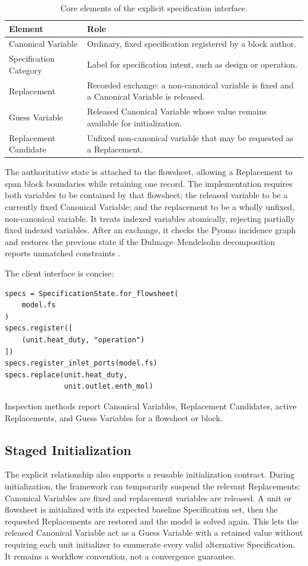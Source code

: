 \documentclass[10pt,letterpaper]{article}
\begin{document}
\begin{table}[htp!]
  \caption{Core elements of the explicit specification interface.}
  \label{tab:concepts}
  \centering
  \renewcommand{\arraystretch}{1.05}
  \begin{tabularx}{\columnwidth}{@{}lX@{}}
    \toprule
    \textbf{Element} & \textbf{Role} \\
    \midrule
    Canonical Variable & Ordinary, fixed specification registered by a block author. \\
    Specification Category & Label for specification intent, such as design or operation. \\
    Replacement & Recorded exchange: a non-canonical variable is fixed and a Canonical Variable is released. \\
    Guess Variable & Released Canonical Variable whose value remains available for initialization. \\
    Replacement Candidate & Unfixed non-canonical variable that may be requested as a Replacement. \\
    \bottomrule
  \end{tabularx}
\end{table}

The authoritative state is attached to the flowsheet, allowing a Replacement to span block boundaries while retaining one record. The implementation requires both variables to be contained by that flowsheet; the released variable to be a currently fixed Canonical Variable; and the replacement to be a wholly unfixed, non-canonical variable. It treats indexed variables atomically, rejecting partially fixed indexed variables. After an exchange, it checks the Pyomo incidence graph and restores the previous state if the Dulmage--Mendelsohn decomposition reports unmatched constraints \cite{bunus2001debugging}.

The client interface is concise:
\begin{lstlisting}[style=psecode]
specs = SpecificationState.for_flowsheet(
    model.fs
)
specs.register([
    (unit.heat_duty, "operation")
])
specs.register_inlet_ports(model.fs)
specs.replace(unit.heat_duty,
              unit.outlet.enth_mol)
\end{lstlisting}
Inspection methods report Canonical Variables, Replacement Candidates, active Replacements, and Guess Variables for a flowsheet or block.

\subsection{Staged Initialization}
The explicit relationship also supports a reusable initialization contract. During initialization, the framework can temporarily suspend the relevant Replacements: Canonical Variables are fixed and replacement variables are released. A unit or flowsheet is initialized with its expected baseline Specification set, then the requested Replacements are restored and the model is solved again. This lets the released Canonical Variable act as a Guess Variable with a retained value without requiring each unit initializer to enumerate every valid alternative Specification. It remains a workflow convention, not a convergence guarantee.
\end{document}
